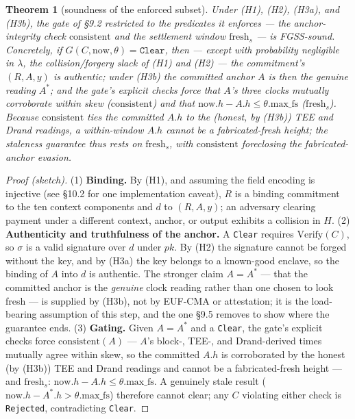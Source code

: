 \documentclass[11pt]{article}
\newtheorem{theorem}{Theorem}
\begin{document}
\begin{theorem}[soundness of the enforced subset]
Under (H1), (H2), (H3a), and (H3b), the gate of \S9.2 restricted to the predicates it enforces --- the anchor-integrity check $\mathrm{consistent}$ and the settlement window $\mathrm{fresh}_s$ --- is FGSS-sound. Concretely, if $G(C, \mathrm{now}, \theta) = \texttt{Clear}$, then --- except with probability negligible in $\lambda$, the collision/forgery slack of (H1) and (H2) --- the commitment's $(R, A, y)$ is authentic; under (H3b) the committed anchor $A$ is then the genuine reading $A^*$; and the gate's explicit checks force that $A$'s three clocks mutually corroborate within skew ($\mathrm{consistent}$) and that $\mathrm{now}.h - A.h \le \theta.\mathrm{max\_fs}$ ($\mathrm{fresh}_s$). Because $\mathrm{consistent}$ ties the committed $A.h$ to the (honest, by (H3b)) TEE and Drand readings, a within-window $A.h$ cannot be a fabricated-fresh height; the staleness guarantee thus rests on $\mathrm{fresh}_s$, with $\mathrm{consistent}$ foreclosing the fabricated-anchor evasion.
\end{theorem}

\begin{proof}[Proof (sketch)]
(1) \textbf{Binding.} By (H1), and assuming the field encoding is injective (see \S10.2 for one implementation caveat), $R$ is a binding commitment to the ten context components and $d$ to $(R, A, y)$; an adversary clearing payment under a different context, anchor, or output exhibits a collision in $H$. (2) \textbf{Authenticity and truthfulness of the anchor.} A \texttt{Clear} requires $\mathrm{Verify}(C)$, so $\sigma$ is a valid signature over $d$ under $pk$. By (H2) the signature cannot be forged without the key, and by (H3a) the key belongs to a known-good enclave, so the binding of $A$ into $d$ is authentic. The stronger claim $A = A^*$ --- that the committed anchor is the \emph{genuine} clock reading rather than one chosen to look fresh --- is supplied by (H3b), not by EUF-CMA or attestation; it is the load-bearing assumption of this step, and the one \S9.5 removes to show where the guarantee ends. (3) \textbf{Gating.} Given $A = A^*$ and a \texttt{Clear}, the gate's explicit checks force $\mathrm{consistent}(A)$ --- $A$'s block-, TEE-, and Drand-derived times mutually agree within skew, so the committed $A.h$ is corroborated by the honest (by (H3b)) TEE and Drand readings and cannot be a fabricated-fresh height --- and $\mathrm{fresh}_s$: $\mathrm{now}.h - A.h \le \theta.\mathrm{max\_fs}$. A genuinely stale result ($\mathrm{now}.h - A^*.h > \theta.\mathrm{max\_fs}$) therefore cannot clear; any $C$ violating either check is \texttt{Rejected}, contradicting \texttt{Clear}.
\end{proof}
\end{document}

